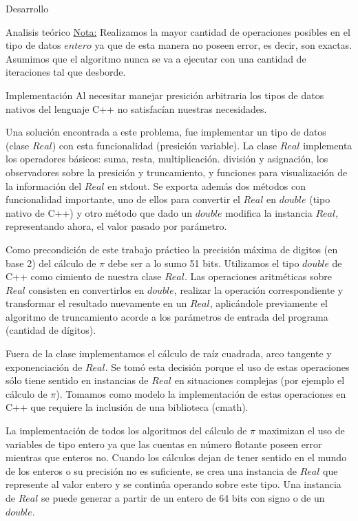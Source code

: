 \begin{section}{Desarrollo}
\begin{subsection}{Analisis teórico}
		\underline{Nota:} Realizamos la mayor cantidad de operaciones posibles en el tipo de datos $entero$ ya que de esta manera no poseen error, es decir, son exactas.
		Asumimos que el algoritmo nunca se va a ejecutar con una cantidad de iteraciones tal que desborde.\\
		
		
		\newpage
		
		\newpage
		
		\newpage
		
	\end{subsection}
	\begin{subsection}{Implementación}
		Al necesitar manejar presición arbitraria los tipos de datos nativos del lenguaje C++ no satisfacían nuestras necesidades.
		
		Una solución encontrada a este problema, fue implementar un tipo de datos (clase $Real$) con esta funcionalidad (presición variable). La clase $Real$ implementa los operadores básicos: suma, resta, multiplicación. división y asignación, los observadores sobre la presición y truncamiento, y funciones para visualización de la información del $Real$ en stdout. Se exporta además dos métodos con funcionalidad importante, uno de ellos para convertir el $Real$ en $double$ (tipo nativo de C++) y otro método que dado un $double$ modifica la instancia $Real$, representando ahora, el valor pasado por parámetro.
		
		Como precondición de este trabajo práctico la precisión máxima de digitos (en base 2) del cálculo de $\pi$ debe ser a lo sumo 51 bits.
		Utilizamos el tipo $double$ de C++ como cimiento de nuestra clase $Real$. Las operaciones aritméticas sobre $Real$ consisten en convertirlos en $double$, realizar la operación correspondiente y transformar el resultado nuevamente en un $Real$, aplicándole previamente el algoritmo de truncamiento
		acorde a los parámetros de entrada del programa (cantidad de dígitos).
		
		Fuera de la clase implementamos el cálculo de raíz cuadrada, arco tangente y exponenciación de $Real$. Se tomó esta decisión porque el uso de estas operaciones sólo tiene sentido en instancias de $Real$ en situaciones complejas (por ejemplo el cálculo de $\pi$). Tomamos como modelo la implementación de estas operaciones en C++ que requiere la inclusión de una biblioteca (cmath).
		
		La implementación de todos los algoritmos del cálculo de $\pi$ maximizan el uso de variables de tipo entero ya que las cuentas en número flotante poseen error mientras que enteros no. Cuando los cálculos dejan de tener sentido en el mundo de los enteros o su precisión no es suficiente, se crea una instancia de $Real$ que represente al valor entero y se continúa operando sobre este tipo. Una instancia de $Real$ se puede generar a partir de un entero de 64 bits con signo o de un $double$.\\
		   

\end{subsection}
\end{section}
